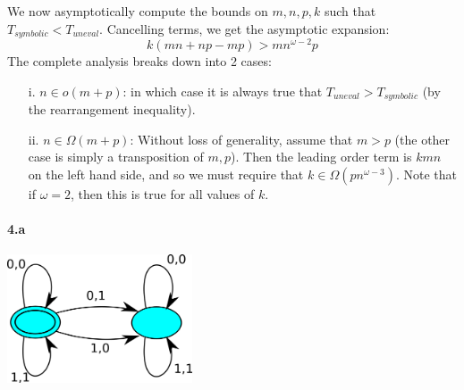 \documentclass{article}
\begin{document}
We now asymptotically compute the bounds on $m, n, p, k$ such that $T_{symbolic} < T_{uneval}$.  Cancelling terms, we get the asymptotic expansion:
\[ k (m n + n p - m p) > m n^{\omega - 2} p\]
The complete analysis breaks down into 2 cases:

\begin{itemize}
\item[i.] $n \in o(m + p)$: in which case it is always true that $T_{uneval} > T_{symbolic}$ (by the rearrangement inequality).

\item[ii.] $n \in \Omega(m + p)$:  Without loss of generality, assume that $m > p$ (the other case is simply a transposition of $m,p$).  Then the leading order term is $kmn$ on the left hand side, and so we must require that $k \in  \Omega( p n^{\omega - 3} )$.  Note that if $\omega = 2$, then this is true for all values of $k$.
\end{itemize}

\paragraph{4.a}
\begin{center}
\includegraphics[height=1.5in]{ndta.png}
\end{center}
\end{document}
